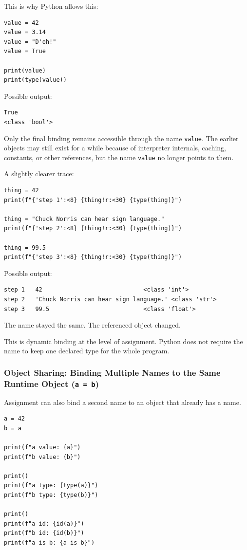 This is why Python allows this:

\begin{verbatim}
value = 42
value = 3.14
value = "D'oh!"
value = True

print(value)
print(type(value))
\end{verbatim}

Possible output:

\begin{verbatim}
True
<class 'bool'>
\end{verbatim}

Only the final binding remains accessible through the name \texttt{value}. The earlier objects may still exist for a while because of interpreter internals, caching, constants, or other references, but the name \texttt{value} no longer points to them.

A slightly clearer trace:

\begin{verbatim}
thing = 42
print(f"{'step 1':<8} {thing!r:<30} {type(thing)}")

thing = "Chuck Norris can hear sign language."
print(f"{'step 2':<8} {thing!r:<30} {type(thing)}")

thing = 99.5
print(f"{'step 3':<8} {thing!r:<30} {type(thing)}")
\end{verbatim}

Possible output:

\begin{verbatim}
step 1   42                             <class 'int'>
step 2   'Chuck Norris can hear sign language.' <class 'str'>
step 3   99.5                           <class 'float'>
\end{verbatim}

The name stayed the same. The referenced object changed.

This is dynamic binding at the level of assignment. Python does not require the name to keep one declared type for the whole program.

\subsubsection{Object Sharing: Binding Multiple Names to the Same Runtime Object (\texttt{a = b})}

Assignment can also bind a second name to an object that already has a name.

\begin{verbatim}
a = 42
b = a

print(f"a value: {a}")
print(f"b value: {b}")

print()
print(f"a type: {type(a)}")
print(f"b type: {type(b)}")

print()
print(f"a id: {id(a)}")
print(f"b id: {id(b)}")
print(f"a is b: {a is b}")
\end{verbatim}

